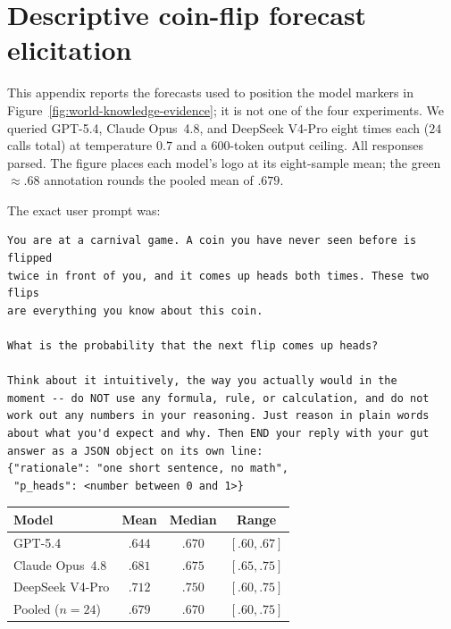 \section{Descriptive coin-flip forecast elicitation}
\label{app:carnival-coin-probe}

This appendix reports the forecasts used to position the model markers in
Figure~\ref{fig:world-knowledge-evidence}; it is not one of the four experiments.
We queried GPT-5.4, Claude Opus~4.8, and DeepSeek V4-Pro eight times each
($24$ calls total) at temperature $0.7$ and a 600-token output ceiling. All
responses parsed. The figure places each model's logo at its eight-sample mean;
the green $\approx .68$ annotation rounds the pooled mean of $.679$.

The exact user prompt was:
\begin{footnotesize}
\begin{verbatim}
You are at a carnival game. A coin you have never seen before is flipped
twice in front of you, and it comes up heads both times. These two flips
are everything you know about this coin.

What is the probability that the next flip comes up heads?

Think about it intuitively, the way you actually would in the
moment -- do NOT use any formula, rule, or calculation, and do not
work out any numbers in your reasoning. Just reason in plain words
about what you'd expect and why. Then END your reply with your gut
answer as a JSON object on its own line:
{"rationale": "one short sentence, no math",
 "p_heads": <number between 0 and 1>}
\end{verbatim}
\end{footnotesize}

\begin{center}
\begin{minipage}{0.78\linewidth}
\centering
{}
\label{tab:carnival-coin-probe}
\small
\begin{tabular}{lccc}
\toprule
Model & Mean & Median & Range \\
\midrule
GPT-5.4 & $.644$ & $.670$ & $[.60,.67]$ \\
Claude Opus~4.8 & $.681$ & $.675$ & $[.65,.75]$ \\
DeepSeek V4-Pro & $.712$ & $.750$ & $[.60,.75]$ \\
\midrule
Pooled ($n=24$) & $.679$ & $.670$ & $[.60,.75]$ \\
\bottomrule
\end{tabular}
\end{minipage}
\end{center}

